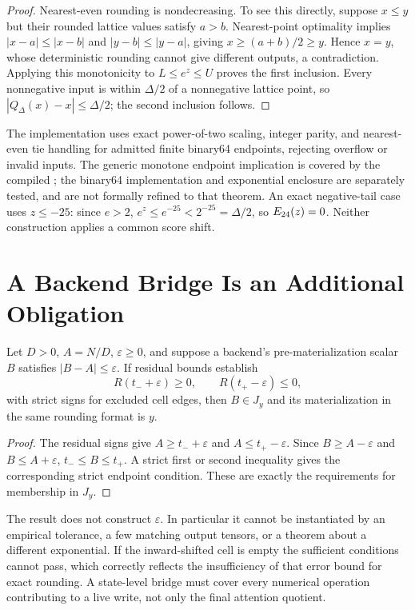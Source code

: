\begin{proof}
Nearest-even rounding is nondecreasing. To see this directly, suppose
$x\le y$ but their rounded lattice values satisfy $a>b$. Nearest-point
optimality implies $|x-a|\le|x-b|$ and $|y-b|\le|y-a|$, giving
$x\ge(a+b)/2\ge y$. Hence $x=y$, whose deterministic rounding cannot
give different outputs, a contradiction. Applying this monotonicity to
$L\le e^z\le U$ proves the first inclusion. Every nonnegative input is
within $\Delta/2$ of a nonnegative lattice point, so
$|Q_\Delta(x)-x|\le\Delta/2$; the second inclusion follows.
\end{proof}

The implementation uses exact power-of-two scaling, integer parity, and
nearest-even tie handling for admitted finite binary64 endpoints, rejecting
overflow or invalid inputs. The generic monotone endpoint implication is
covered by the compiled ; the
binary64 implementation and exponential enclosure are separately tested,
and are not formally refined to that theorem. An exact negative-tail case
uses $z\le-25$: since $e>2$, $e^z\le e^{-25}<2^{-25}=\Delta/2$,
so $E_{24}(z)=0$. Neither construction applies a common score shift.

\section{A Backend Bridge Is an Additional Obligation}
\label{app:bridge}

\begin{proposition}
Let $D>0$, $A=N/D$, $\varepsilon\ge0$, and suppose a backend's
pre-materialization scalar $B$ satisfies $|B-A|\le\varepsilon$.
If residual bounds establish
\begin{equation}
 R(t_-+\varepsilon)\ge0,\qquad
 R(t_+-\varepsilon)\le0,
\end{equation}
with strict signs for excluded cell edges, then $B\in J_y$ and its
materialization in the same rounding format is $y$.
\end{proposition}
\begin{proof}
The residual signs give $A\ge t_-+\varepsilon$ and
$A\le t_+-\varepsilon$. Since $B\ge A-\varepsilon$ and
$B\le A+\varepsilon$, $t_-\le B\le t_+$. A strict first or second
inequality gives the corresponding strict endpoint condition. These are
exactly the requirements for membership in $J_y$.
\end{proof}

The result does not construct $\varepsilon$. In particular it cannot be
instantiated by an empirical tolerance, a few matching output tensors, or
a theorem about a different exponential. If the inward-shifted cell is
empty the sufficient conditions cannot pass, which correctly reflects the
insufficiency of that error bound for exact rounding. A state-level bridge
must cover every numerical operation contributing to a live write, not
only the final attention quotient.

